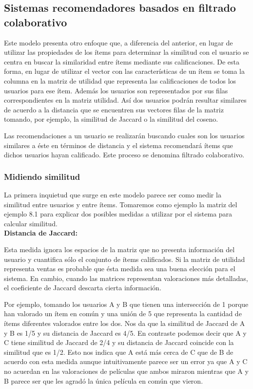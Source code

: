 	\subsection{Sistemas recomendadores basados en filtrado colaborativo}
	
	Este modelo presenta otro enfoque que, a diferencia del anterior, en lugar de utilizar las propiedades de los ítems para determinar la similitud con el usuario se centra en buscar la similaridad entre ítems mediante sus calificaciones. De esta forma, en lugar de utilizar el vector con las características de un ítem se toma la columna en la matriz de utilidad que representa las calificaciones de todos los usuarios para ese ítem. Además los usuarios son representados por sus filas correspondientes en la matriz utilidad. Así dos usuarios podrán resultar similares de acuerdo a la distancia que se encuentren sus vectores filas de la matriz tomando, por ejemplo, la similitud de Jaccard o la similitud del coseno. \par
	Las recomendaciones a un usuario se realizarán buscando cuales son los usuarios similares a éste en términos de distancia y el sistema recomendará ítems que dichos usuarios hayan calificado. Este proceso se denomina filtrado colaborativo.
	
	\subsubsection{Midiendo similitud}
	La primera inquietud que surge en este modelo parece ser como medir la similitud entre usuarios y entre ítems. Tomaremos como ejemplo la matriz del ejemplo 8.1 para explicar dos posibles medidas a utilizar por el sistema para calcular similitud. \\
	
	\textbf{Distancia de Jaccard:} \par
	Esta medida ignora los espacios de la matriz que no presenta información del usuario y cuantifica sólo el conjunto de ítems calificados. Si la matriz de utilidad representa ventas es probable que ésta medida sea una buena elección para el sistema. En cambio, cuando las matrices representan valoraciones más detalladas, el coeficiente de Jaccard descarta cierta información. \par

	Por ejemplo, tomando los usuarios A y B que tienen una intersección de 1 porque han valorado un ítem en común y una unión de 5 que representa la cantidad de ítems diferentes valorados entre los dos. Nos da que la similitud de Jaccard de A y B es 1/5 y su distancia de Jaccard es 4/5. En contraste podemos decir que A y C tiene similitud de Jaccard de 2/4 y su distancia de Jaccard coincide con la similitud que es 1/2. Esto nos indica que A está más cerca de C que de B de acuerdo con esta medida aunque intuitivamente parece ser un error ya que A y C no acuerdan en las valoraciones de películas que ambos miraron mientras que A y B parece ser que les agradó la única película en común que vieron. \\

